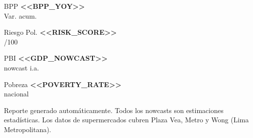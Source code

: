 \documentclass[10pt,a4paper]{article}
\newcommand{\kpivalue}[1]{%
  {\fontsize{16}{18}\selectfont\bfseries\color{ink}#1}%
}
\newcommand{\kpilabel}[1]{%
  {\small\color{ink3}#1}%
}
\begin{document}
\begin{center}
\noindent
\begin{minipage}[t]{0.22\textwidth}
  \begin{kpibox}{BPP}
    \centering
    \kpivalue{<<BPP_YOY>>}\\[2pt]
    \kpilabel{Var. acum.}
  \end{kpibox}
\end{minipage}%
\hfill
\begin{minipage}[t]{0.22\textwidth}
  \begin{kpibox}{Riesgo Pol.}
    \centering
    \kpivalue{<<RISK_SCORE>>}\\[2pt]
    \kpilabel{/100}
  \end{kpibox}
\end{minipage}%
\hfill
\begin{minipage}[t]{0.22\textwidth}
  \begin{kpibox}{PBI}
    \centering
    \kpivalue{<<GDP_NOWCAST>>}\\[2pt]
    \kpilabel{nowcast i.a.}
  \end{kpibox}
\end{minipage}%
\hfill
\begin{minipage}[t]{0.22\textwidth}
  \begin{kpibox}{Pobreza}
    \centering
    \kpivalue{<<POVERTY_RATE>>}\\[2pt]
    \kpilabel{nacional}
  \end{kpibox}
\end{minipage}

\end{center}

\newpage
\thispagestyle{plain}
\tableofcontents
\vspace{1em}

\begin{tcolorbox}[
  enhanced,
  colback=bg,
  colframe=border,
  boxrule=0.5pt,
  arc=2pt,
  left=6pt, right=6pt, top=4pt, bottom=4pt,
]
  {\footnotesize\color{ink3}
    Reporte generado automáticamente. Todos los nowcasts son estimaciones estadísticas.
    Los datos de supermercados cubren Plaza Vea, Metro y Wong (Lima Metropolitana).
  }
\end{tcolorbox}

\newpage
\pagestyle{fancy}
\end{document}
